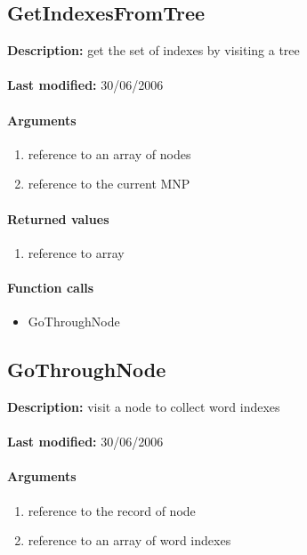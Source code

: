 \subsection{GetIndexesFromTree}
\textbf{Description:} get the set of indexes by visiting a tree\\
\\\textbf{Last modified:} 30/06/2006

\paragraph{Arguments}
\begin{enumerate}
\item reference to an array of nodes
\item reference to the current MNP
\end{enumerate}

\paragraph{Returned values}
\begin{enumerate}
\item reference to array
\end{enumerate}

\paragraph{Function calls}
\begin{itemize}
\item GoThroughNode
\end{itemize}

\subsection{GoThroughNode}
\textbf{Description:} visit a node to collect word indexes\\
\\\textbf{Last modified:} 30/06/2006

\paragraph{Arguments}
\begin{enumerate}
\item reference to the record of node
\item reference to an array of word indexes
\end{enumerate}

